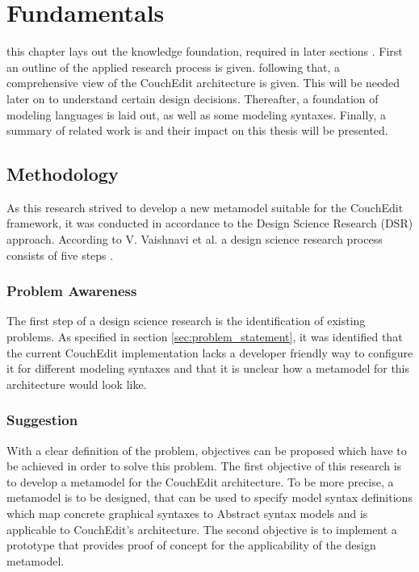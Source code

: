 \chapter{Fundamentals}
\label{chap:fundamentals}

this chapter lays out the knowledge foundation, required in later sections . First an outline of the applied research process is given. following that, a comprehensive view of the CouchEdit architecture is given. This will be needed later on to understand certain design decisions. Thereafter, a foundation of modeling languages is laid out, as well as some modeling syntaxes. Finally, a summary of related work is and their impact on this thesis will be presented. 

\section{Methodology}
As this research strived to develop a new metamodel suitable for the CouchEdit framework, it was conducted in accordance to the Design Science Research (DSR) approach. According to V. Vaishnavi et al. a design science research process consists of five steps \cite{vaishnavi_design_2004}.

\subsection{Problem Awareness}
The first step of a design science research is the identification of existing problems. As specified in section \ref{sec:problem_statement}, it was identified that the current CouchEdit implementation lacks a developer friendly way to configure it for different modeling syntaxes and that it is unclear how a metamodel for this architecture would look like.

\subsection{Suggestion}
With a clear definition of the problem, objectives can be proposed which have to be achieved in order to solve this problem. The first objective of this research is to develop a metamodel for the CouchEdit architecture. To be more precise, a metamodel is to be designed, that can be used to specify model syntax definitions which map concrete graphical syntaxes to Abstract syntax models and is applicable to CouchEdit's architecture. The second objective is to implement a prototype that provides proof of concept for the applicability of the design metamodel.


